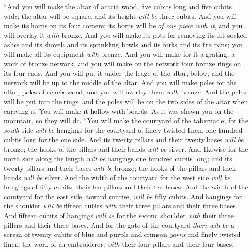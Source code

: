 \begin{biblechapter} %
 “And you will make the altar of acacia wood, five cubits long and five cubits wide; the altar will be square, and its height \textit{will be} three cubits.
\verse And you will make its horns on its four corners; its horns will be \textit{of one piece with it}, and you will overlay it \textit{with} bronze.
\verse And you will make its pots for removing its fat-soaked ashes and its shovels and its sprinkling bowls and its forks and its fire pans; you will make all its equipment \textit{with} bronze.
\verse And you will make for it a grating, a work of bronze network, and you will make on the network four bronze rings on its four ends.
\verse And you will put it under the ledge of the altar, below, and the network will be up to the middle of the altar.
\verse And you will make poles for the altar, poles of acacia wood, and you will overlay them \textit{with} bronze.
\verse And the poles will be put into the rings, and the poles will be on the two sides of the altar when carrying it.
\verse You will make it hollow with boards. As it was shown you on the mountain, so they will do.
 “You will make the courtyard of the tabernacle; for the \textit{south} side \textit{will be} hangings for the courtyard of finely twisted linen, one hundred cubits long for the one side.
\verse And its twenty pillars and their twenty bases \textit{will be} bronze; the hooks of the pillars and their bands \textit{will be} silver.
\verse And likewise for the north side along the length \textit{will be} hangings one hundred cubits long; and its twenty pillars and their bases \textit{will be} bronze; the hooks of the pillars and their bands \textit{will be} silver.
\verse And the width of the courtyard for the west side \textit{will be} hangings of fifty cubits, their ten pillars and their ten bases.
\verse And the width of the courtyard for the east side, toward sunrise, \textit{will be} fifty cubits.
\verse And hangings for the shoulder \textit{will be} fifteen cubits \textit{with} their three pillars and their three bases.
\verse And fifteen cubits of hangings \textit{will be} for the second shoulder \textit{with} their three pillars and their three bases.
\verse And for the gate of the courtyard \textit{there will be} a screen of twenty cubits of blue and purple and crimson \textit{yarns} and finely twisted linen, the work of an embroiderer; \textit{with} their four pillars and their four bases.

\end{biblechapter}
